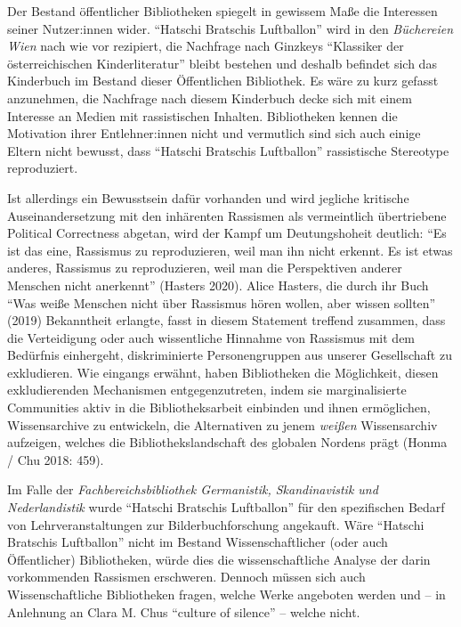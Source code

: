 \documentclass[a4paper,
fontsize=11pt,
oneside,
numbers=noperiodatend,
parskip=half-,
bibliography=totoc,
final
]{scrartcl}
\begin{document}
Der Bestand öffentlicher Bibliotheken spiegelt in gewissem Maße die
Interessen seiner Nutzer:innen wider. \enquote{Hatschi Bratschis Luftballon}
wird in den \emph{Büchereien Wien} nach wie vor rezipiert, die Nachfrage
nach Ginzkeys \enquote{Klassiker der österreichischen Kinderliteratur} bleibt
bestehen und deshalb befindet sich das Kinderbuch im Bestand dieser
Öffentlichen Bibliothek. Es wäre zu kurz gefasst anzunehmen, die
Nachfrage nach diesem Kinderbuch decke sich mit einem Interesse an
Medien mit rassistischen Inhalten. Bibliotheken kennen die Motivation
ihrer Entlehner:innen nicht und vermutlich sind sich auch einige Eltern
nicht bewusst, dass \enquote{Hatschi Bratschis Luftballon} rassistische
Stereotype reproduziert.

Ist allerdings ein Bewusstsein dafür vorhanden und wird jegliche
kritische Auseinandersetzung mit den inhärenten Rassismen als
vermeintlich übertriebene Political Correctness abgetan, wird der Kampf
um Deutungshoheit deutlich: \enquote{Es ist das eine, Rassismus zu
reproduzieren, weil man ihn nicht erkennt. Es ist etwas anderes,
Rassismus zu reproduzieren, weil man die Perspektiven anderer Menschen
nicht anerkennt} (Hasters 2020). Alice Hasters, die durch ihr Buch
\enquote{Was weiße Menschen nicht über Rassismus hören wollen, aber wissen
sollten} (2019) Bekanntheit erlangte, fasst in diesem Statement
treffend zusammen, dass die Verteidigung oder auch wissentliche Hinnahme
von Rassismus mit dem Bedürfnis einhergeht, diskriminierte
Personengruppen aus unserer Gesellschaft zu exkludieren. Wie eingangs
erwähnt, haben Bibliotheken die Möglichkeit, diesen exkludierenden
Mechanismen entgegenzutreten, indem sie marginalisierte Communities
aktiv in die Bibliotheksarbeit einbinden und ihnen ermöglichen,
Wissensarchive zu entwickeln, die Alternativen zu jenem \emph{weißen}
Wissensarchiv aufzeigen, welches die Bibliothekslandschaft des globalen
Nordens prägt (Honma / Chu 2018: 459).

Im Falle der \emph{Fachbereichsbibliothek Germanistik, Skandinavistik
und Nederlandistik} wurde \enquote{Hatschi Bratschis Luftballon} für den
spezifischen Bedarf von Lehrveranstaltungen zur Bilderbuchforschung
angekauft. Wäre \enquote{Hatschi Bratschis Luftballon} nicht im Bestand
Wissenschaftlicher (oder auch Öffentlicher) Bibliotheken, würde dies die
wissenschaftliche Analyse der darin vorkommenden Rassismen erschweren.
Dennoch müssen sich auch Wissenschaftliche Bibliotheken fragen, welche
Werke angeboten werden und -- in Anlehnung an Clara M. Chus \enquote{culture of
silence} -- welche nicht.
\end{document}

